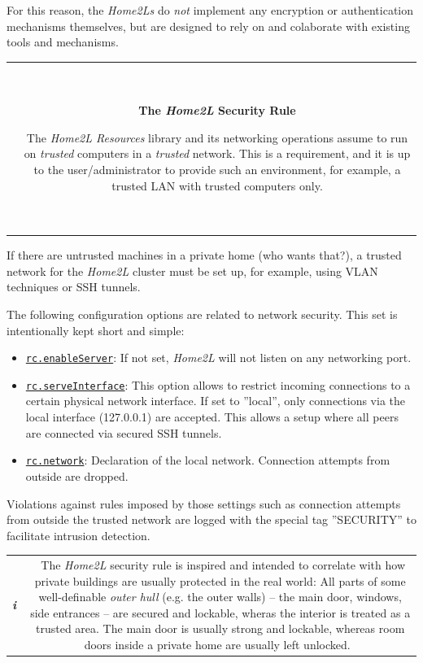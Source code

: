 \documentclass[12pt,english,parskip=half,headheight=19pt]{scrreprt}
\newcommand{\infobox}[1]{
  \par
  \medskip
  \hfill
  \setlength\arrayrulewidth{1pt}
  \begin{tabular}[t]{c|c|}
    \parbox{1.8em}{\hfill\textit{\Huge\textbf{i}\,}}
    &
    \,\parbox{0.89\linewidth}{\setlength{\parskip}{0.5em} \small #1}\,
  \end{tabular}
  \medskip
  \par
}
\newcommand{\warnbox}[1]{
  \par
  \medskip
  \hfill
  \setlength\arrayrulewidth{1pt}
  \begin{tabular}[b]{c|c|}
    
    &
    \,\parbox{0.89\linewidth}{\setlength{\parskip}{0.5em}#1}\,
  \end{tabular}
  \medskip
  \par
}
\newcommand{\idx}[1]{#1\index{#1}}
\newcommand{\refenv}[1]{\hyperref[env:#1]{\texttt{#1}}}        %
\begin{document}
For this reason, the \textit{Home2Ls} do \textit{not} implement any encryption or authentication mechanisms themselves, but are designed to rely on and colaborate with existing tools and mechanisms.

\warnbox{
  \textbf{The \textit{Home2L} Security Rule}

  The \textit{Home2L Resources} library and its networking operations assume to run on
  \textit{trusted} computers in a \textit{trusted} network.
  This is a requirement, and it is up to the user/administrator to provide
  such an environment, for example, a trusted LAN with trusted computers only.
}

If there are untrusted machines in a private home (who wants that?), a trusted network for the \textit{Home2L} cluster must be set up, for example, using VLAN techniques or SSH tunnels.

The following configuration options are related to network security.
This set is intentionally kept short and simple:

\begin{itemize}
\item
  \refenv{rc.enableServer}: If not set, \textit{Home2L} will not listen on any networking port.
\item
  \refenv{rc.serveInterface}: This option allows to restrict incoming connections
  to a certain physical network interface. If set to ”local”, only connections via
  the local interface (127.0.0.1) are accepted. This allows a setup where
  all peers are connected via secured SSH tunnels.
\item
  \refenv{rc.network}: Declaration of the local network. Connection attempts
  from outside are dropped.
\end{itemize}

Violations against rules imposed by those settings such as connection
attempts from outside the trusted network are logged with the special
tag ''SECURITY'' to facilitate intrusion detection.

\infobox{
  The \textit{Home2L} security rule is inspired and intended to correlate with how private
  buildings are usually protected in the real world:
  All parts of some well-definable \textit{outer hull} (e.g. the outer walls) -- the
  main door,  windows, side entrances -- are secured and lockable, wheras the
  interior is treated as a trusted area. The main door is usually strong and lockable, whereas
  room doors inside a private home are usually left unlocked.
}
\end{document}
